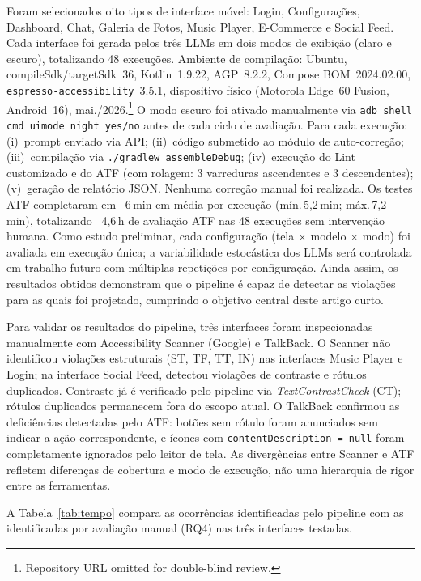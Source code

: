\documentclass[sigconf,review]{webmedia}
\begin{document}
Foram selecionados oito tipos de interface móvel: Login, Configurações,
Dashboard, Chat, Galeria de Fotos, Music Player, E-Commerce e Social Feed.
Cada interface foi gerada pelos três LLMs em dois modos de exibição (claro
e escuro), totalizando 48 execuções. Ambiente de compilação: Ubuntu,
compileSdk/targetSdk~36, Kotlin~1.9.22, AGP~8.2.2, Compose
BOM~2024.02.00, \texttt{espresso-accessibility}~3.5.1, dispositivo físico
(Motorola Edge~60 Fusion, Android~16), mai./2026.\footnote{Repository URL omitted for double-blind review.}
O modo escuro foi ativado manualmente via
\texttt{adb shell cmd uimode night yes/no} antes de cada ciclo de
avaliação. Para cada execução: (i)~prompt enviado via API;
(ii)~código submetido ao módulo de auto-correção; (iii)~compilação via
\texttt{./gradlew assembleDebug}; (iv)~execução do Lint customizado e do
ATF (com rolagem: 3 varreduras ascendentes e 3 descendentes); (v)~geração
de relatório JSON. Nenhuma correção manual foi realizada. Os testes ATF
completaram em ~6\,min em média por execução
(mín.\,5,2\,min; máx.\,7,2\,min), totalizando ~4,6\,h de avaliação ATF
nas 48 execuções sem intervenção humana.
Como estudo preliminar, cada configuração (tela $\times$ modelo $\times$
modo) foi avaliada em execução única; a variabilidade estocástica dos LLMs
será controlada em trabalho futuro com múltiplas repetições por
configuração. Ainda assim, os resultados obtidos demonstram que o pipeline
é capaz de detectar as violações para as quais foi projetado, cumprindo o
objetivo central deste artigo curto.

Para validar os resultados do pipeline, três interfaces foram inspecionadas
manualmente com Accessibility Scanner (Google) e TalkBack. O Scanner não
identificou violações estruturais (ST, TF, TT, IN) nas interfaces Music Player
e Login; na interface Social Feed, detectou violações de contraste e rótulos
duplicados. Contraste já é verificado pelo pipeline via \textit{TextContrastCheck}
(CT); rótulos duplicados permanecem fora do escopo atual.
O TalkBack confirmou as deficiências detectadas pelo ATF: botões sem rótulo
foram anunciados sem indicar a ação correspondente, e ícones com
\texttt{contentDescription\,=\,null} foram completamente ignorados pelo leitor
de tela. As divergências entre Scanner e ATF refletem diferenças de cobertura
e modo de execução, não uma hierarquia de rigor entre as ferramentas.

A Tabela~\ref{tab:tempo} compara as ocorrências identificadas pelo pipeline com
as identificadas por avaliação manual (RQ4) nas três interfaces testadas.
\end{document}
